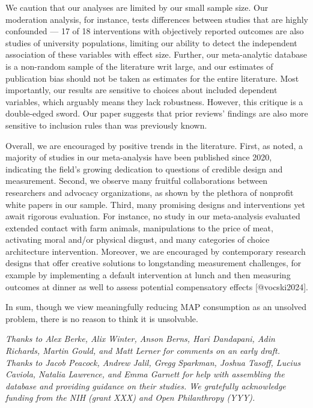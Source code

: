\documentclass[sn-nature,referee,pdflatex]{sn-jnl}
\begin{document}
We caution that our analyses are limited by our small sample size. Our
moderation analysis, for instance, tests differences between studies
that are highly confounded --- 17 of 18 interventions with objectively
reported outcomes are also studies of university populations, limiting
our ability to detect the independent association of these variables
with effect size. Further, our meta-analytic database is a non-random
sample of the literature writ large, and our estimates of publication
bias should not be taken as estimates for the entire literature. Most
importantly, our results are sensitive to choices about included
dependent variables, which arguably means they lack robustness. However,
this critique is a double-edged sword. Our paper suggests that prior
reviews' findings are also more sensitive to inclusion rules than was
previously known.

Overall, we are encouraged by positive trends in the literature. First,
as noted, a majority of studies in our meta-analysis have been published
since 2020, indicating the field's growing dedication to questions of
credible design and measurement. Second, we observe many fruitful
collaborations between researchers and advocacy organizations, as shown
by the plethora of nonprofit white papers in our sample. Third, many
promising designs and interventions yet await rigorous evaluation. For
instance, no study in our meta-analysis evaluated extended contact with
farm animals, manipulations to the price of meat, activating moral
and/or physical disgust, and many categories of choice architecture
intervention. Moreover, we are encouraged by contemporary research
designs that offer creative solutions to longstanding measurement
challenges, for example by implementing a default intervention at lunch
and then measuring outcomes at dinner as well to assess potential
compensatory effects {[}@vocski2024{]}.

In sum, though we view meaningfully reducing MAP consumption as an
unsolved problem, there is no reason to think it is unsolvable.


\emph{Thanks to Alex Berke, Alix Winter, Anson Berns, Hari Dandapani,
Adin Richards, Martin Gould, and Matt Lerner for comments on an early
draft. Thanks to Jacob Peacock, Andrew Jalil, Gregg Sparkman, Joshua
Tasoff, Lucius Caviola, Natalia Lawrence, and Emma Garnett for help with
assembling the database and providing guidance on their studies. We
gratefully acknowledge funding from the NIH (grant XXX) and Open
Philanthropy (YYY).}
\end{document}
